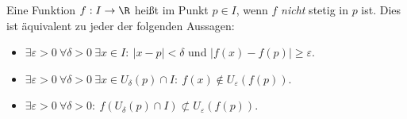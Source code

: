 Eine Funktion $f: I \to \R$ heißt  im Punkt $p \in I$, wenn $f$ \textit{nicht} stetig in $p$ ist. Dies ist äquivalent zu jeder der folgenden Aussagen:
\begin{itemize}
    \item $\exists \varepsilon > 0 \ \forall \delta > 0 \ \exists x \in I: \ |x-p| < \delta$ und $|f(x) - f(p)| \geq \varepsilon$.
    \item $\exists \varepsilon > 0 \ \forall \delta > 0 \ \exists x \in U_\delta(p) \cap I: \ f(x) \notin U_\varepsilon(f(p))$.
    \item $\exists \varepsilon > 0 \ \forall \delta > 0: \ f(U_\delta(p) \cap I) \not\subset U_\varepsilon(f(p))$.
\end{itemize}